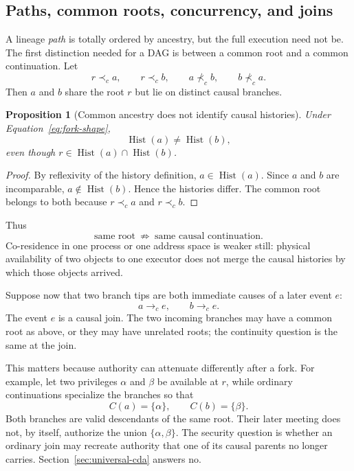 \documentclass[10pt,twocolumn]{article}
\newcommand{\hb}{\prec_{c}}
\newcommand{\Hist}{\operatorname{Hist}}
\newtheorem{proposition}{Proposition}
\begin{document}
\subsection{Paths, common roots, concurrency, and joins}

A lineage \emph{path} is totally ordered by ancestry, but the full execution
need not be.  The first distinction needed for a DAG is between a common root
and a common continuation.  Let
\begin{equation}
  r\hb a,\qquad r\hb b,
  \qquad
  a\not\hb b,\qquad b\not\hb a.
  \label{eq:fork-shape}
\end{equation}
Then $a$ and $b$ share the root $r$ but lie on distinct causal branches.

\begin{proposition}[Common ancestry does not identify causal histories]
\label{prop:common-root}
Under Equation~\eqref{eq:fork-shape},
\begin{equation}
  \Hist(a)\neq\Hist(b),
\end{equation}
even though $r\in\Hist(a)\cap\Hist(b)$.
\end{proposition}

\begin{proof}
By reflexivity of the history definition, $a\in\Hist(a)$.  Since $a$ and $b$
are incomparable, $a\notin\Hist(b)$.  Hence the histories differ.  The common
root belongs to both because $r\hb a$ and $r\hb b$.
\end{proof}

Thus
\begin{equation}
  \boxed{\text{same root}\ \not\Rightarrow\ \text{same causal continuation}.}
  \label{eq:same-root-not-same-lineage}
\end{equation}
Co-residence in one process or one address space is weaker still: physical
availability of two objects to one executor does not merge the causal histories
by which those objects arrived.

Suppose now that two branch tips are both immediate causes of a later event
$e$:
\begin{equation}
  a\to_c e,
  \qquad
  b\to_c e.
  \label{eq:causal-join-shape}
\end{equation}
The event $e$ is a causal join.  The two incoming branches may have a common
root as above, or they may have unrelated roots; the continuity question is the
same at the join.

This matters because authority can attenuate differently after a fork.  For
example, let two privileges $\alpha$ and $\beta$ be available at $r$, while
ordinary continuations specialize the branches so that
\begin{equation}
  C(a)=\{\alpha\},
  \qquad
  C(b)=\{\beta\}.
  \label{eq:branch-specialization}
\end{equation}
Both branches are valid descendants of the same root.  Their later meeting does
not, by itself, authorize the union $\{\alpha,\beta\}$.  The security question
is whether an ordinary join may recreate authority that one of its causal
parents no longer carries.  Section~\ref{sec:universal-cda} answers no.
\end{document}
